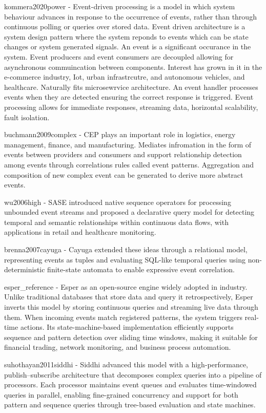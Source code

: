 kommera2020power - Event-driven processing is a model in which system behaviour advances in response to the occurrence of events, rather than through continuous polling or queries over stored data. Event driven architecture is a system design pattern where the system reponds to events which can be state changes or system generated signals. An event is a significant occurance in the system. Event producers and event consumers are decoupled allowing for asynchronous commuincation between components. Interest has grown in it in the e-commerce industry, Iot, urban infrastrcutre, and autonomous vehicles, and healthcare. Naturally fits microsewrvice architecture. An event handler processes events when they are detected ensuring the correct response is triggered. Event processing allows for immediate responses, streaming data, horizontal scalability, fault isolation.


buchmann2009complex - CEP plays an important role in logistics, energy management, finance, and manufacturing. Mediates infromation in the form of events between providers and consumers and support relationship detection among events through correlations rules called event patterns. Aggregation and composition of new complex event can be generated to derive more abstract events.


wu2006high - SASE introduced native sequence operators for processing unbounded event streams and proposed a declarative query model for detecting temporal and semantic relationships within continuous data flows, with applications in retail and healthcare monitoring.

brenna2007cayuga - Cayuga extended these ideas through a relational model, representing events as tuples and evaluating SQL-like temporal queries using non-deterministic finite-state automata to enable expressive event correlation. 

esper_reference - Esper as an open-source engine widely adopted in industry. Unlike traditional databases that store data and query it retrospectively, Esper inverts this model by storing continuous queries and streaming live data through them. When incoming events match registered patterns, the system triggers real-time actions. Its state-machine-based implementation efficiently supports sequence and pattern detection over sliding time windows, making it suitable for financial trading, network monitoring, and business process automation. 

suhothayan2011siddhi - Siddhi  advanced this model with a high-performance, publish–subscribe architecture that decomposes complex queries into a pipeline of processors. Each processor maintains event queues and evaluates time-windowed queries in parallel, enabling fine-grained concurrency and support for both pattern and sequence queries through tree-based evaluation and state machines. 

